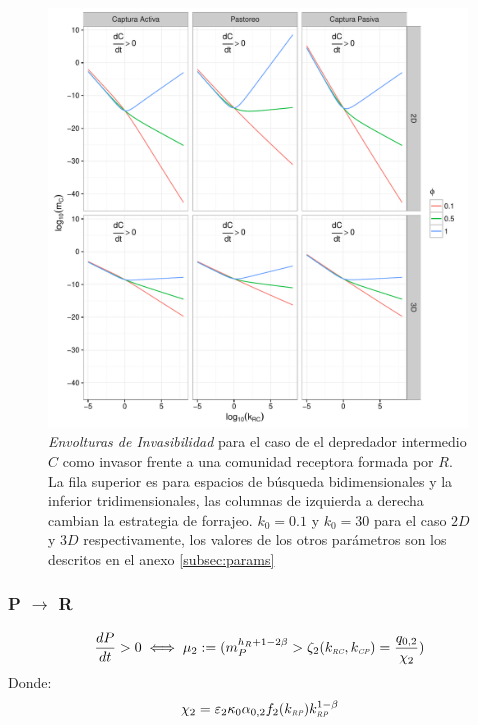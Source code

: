 \begin{figure}[!htbp]
  \centering
  \includegraphics[width = 0.99\textwidth]{./Plots/R-CInv.pdf}
  \caption[Invasibilidad R-C]{\emph{Envolturas de Invasibilidad} para el caso de el depredador intermedio $C$ como invasor frente a una comunidad receptora formada por $R$. La fila superior es para espacios de b\'usqueda bidimensionales y la inferior tridimensionales, las columnas de izquierda a derecha cambian la estrategia de forrajeo. $k_0 = 0.1$ y $k_0 = 30$ para el caso $2D$ y $3D$ respectivamente, los valores de los otros par\'ametros son los descritos en el anexo \ref{subsec:params}}
  \label{fig:R-CInv}
\end{figure}

\subsubsection{P $\to$ R}

\begin{equation}
  \frac{dP}{dt} >0 \iff \mu_2 := ( m_P^{h_R + 1 - 2\beta} > \zeta_2(k_{\textit{\tiny RC}},k_{\textit{\tiny CP}}) = \frac{q_{0,2}}{\chi_2} )
\end{equation}
Donde:
\begin{equation}
  \begin{aligned}
    \chi_2 &= \varepsilon_2 \kappa_0\alpha_{0,2} f_2(k_{\textit{\tiny RP}})k_{\textit{\tiny RP}}^{1-\beta} \\
  \end{aligned}
\end{equation}

